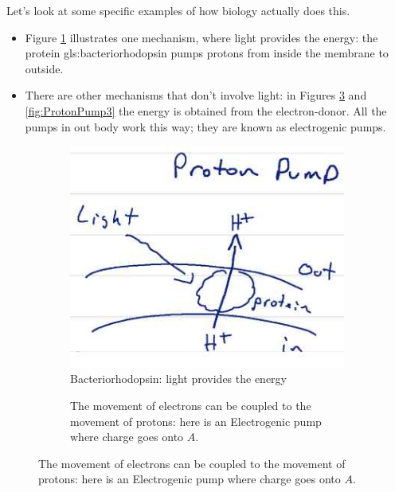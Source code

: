 \documentclass[]{article}
\begin{document}
Let's look at some specific examples of how biology actually does this. \begin{itemize}
	\item Figure \ref{fig:ProtonPump1} illustrates one mechanism, where light provides the energy: the protein \gls{gls:bacteriorhodopsin} pumps protons from inside the membrane to outside.
	\item There are other mechanisms that don't involve light:  in Figures \ref{fig:ProtonPump2} and \ref{fig:ProtonPump3} the energy is obtained from the electron-donor. All the pumps in out body work this way; they are known as electrogenic pumps.
\end{itemize}

\begin{figure}[H]
	\caption{Mechanisms for pumping electrons}
	\begin{subfigure}[t]{0.3\textwidth}
		\caption{Bacteriorhodopsin: light provides the energy}\label{fig:ProtonPump1}
		\includegraphics[width=\textwidth]{ProtonPump1}
	\end{subfigure}
	\;
	\begin{subfigure}[t]{0.3\textwidth}
		\caption{The movement of electrons can be coupled to the movement of protons: here is an Electrogenic pump where charge goes onto $A$.}\label{fig:ProtonPump2}

\end{subfigure}
\end{figure}
\end{document}
